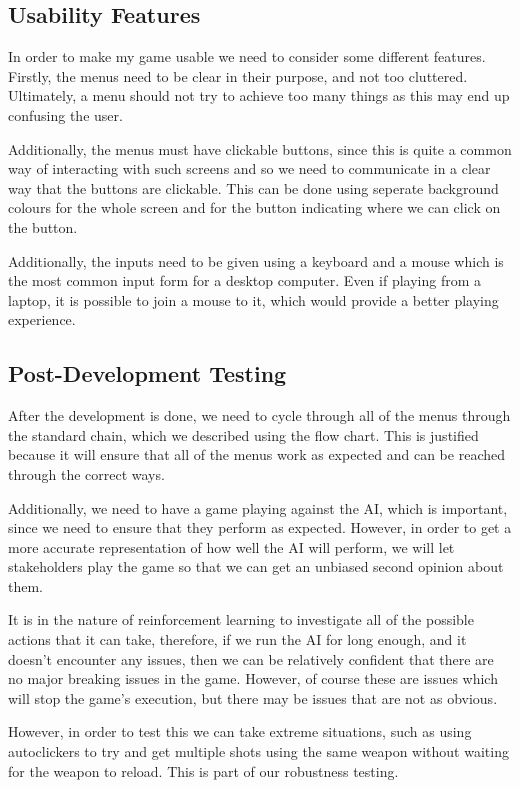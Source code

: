 \subsection{Usability Features}

In order to make my game usable we need to consider some different features. Firstly, the menus need to be clear in their purpose, and not too cluttered. Ultimately, a menu should not try to achieve too many things as this may end up confusing the user.

\vs
Additionally, the menus must have clickable buttons, since this is quite a common way of interacting with such screens and so we need to communicate in a clear way that the buttons are clickable. This can be done using seperate background colours for the whole screen and for the button indicating where we can click on the button.

\vs
Additionally, the inputs need to be given using a keyboard and a mouse which is the most common input form for a desktop computer. Even if playing from a laptop, it is possible to join a mouse to it, which would provide a better playing experience.

\subsection{Post-Development Testing}

After the development is done, we need to cycle through all of the menus through the standard chain, which we described using the flow chart. This is justified because it will ensure that all of the menus work as expected and can be reached through the correct ways.

\vs
Additionally, we need to have a game playing against the AI, which is important, since we need to ensure that they perform as expected. However, in order to get a more accurate representation of how well the AI will perform, we will let stakeholders play the game so that we can get an unbiased second opinion about them.

\vs
It is in the nature of reinforcement learning to investigate all of the possible actions that it can take, therefore, if we run the AI for long enough, and it doesn't encounter any issues, then we can be relatively confident that there are no major breaking issues in the game. However, of course these are issues which will stop the game's execution, but there may be issues that are not as obvious.

\vs
However, in order to test this we can take extreme situations, such as using autoclickers to try and get multiple shots using the same weapon without waiting for the weapon to reload. This is part of our robustness testing.
